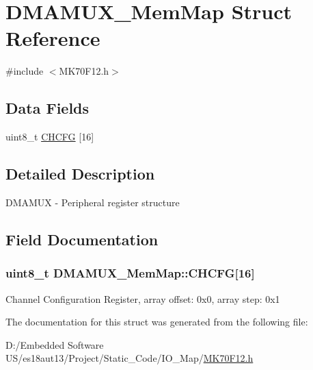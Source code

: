 \hypertarget{struct_d_m_a_m_u_x___mem_map}{}\section{D\+M\+A\+M\+U\+X\+\_\+\+Mem\+Map Struct Reference}
\label{struct_d_m_a_m_u_x___mem_map}


{\ttfamily \#include $<$M\+K70\+F12.\+h$>$}

\subsection*{Data Fields}
\begin{DoxyCompactItemize}
\item 
uint8\+\_\+t \hyperlink{struct_d_m_a_m_u_x___mem_map_a7ba04adde18230ace5b01e6b01725638}{C\+H\+C\+F\+G} \mbox{[}16\mbox{]}
\end{DoxyCompactItemize}


\subsection{Detailed Description}
D\+M\+A\+M\+U\+X -\/ Peripheral register structure 

\subsection{Field Documentation}
\hypertarget{struct_d_m_a_m_u_x___mem_map_a7ba04adde18230ace5b01e6b01725638}{}
\subsubsection[{C\+H\+C\+F\+G}]{\setlength{\rightskip}{0pt plus 5cm}uint8\+\_\+t D\+M\+A\+M\+U\+X\+\_\+\+Mem\+Map\+::\+C\+H\+C\+F\+G\mbox{[}16\mbox{]}}\label{struct_d_m_a_m_u_x___mem_map_a7ba04adde18230ace5b01e6b01725638}
Channel Configuration Register, array offset\+: 0x0, array step\+: 0x1 

The documentation for this struct was generated from the following file\+:\begin{DoxyCompactItemize}
\item 
D\+:/\+Embedded Software U\+S/es18aut13/\+Project/\+Static\+\_\+\+Code/\+I\+O\+\_\+\+Map/\hyperlink{_m_k70_f12_8h}{M\+K70\+F12.\+h}\end{DoxyCompactItemize}
